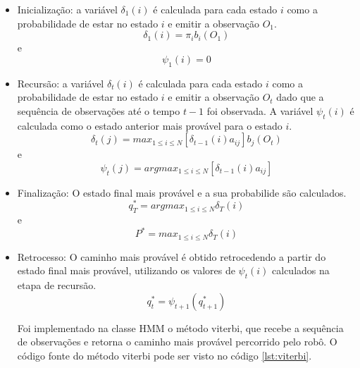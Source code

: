 \begin{itemize}
\begin{tcolorbox}[title=Resposta:]
        \begin{itemize}
            \item Inicialização: a variável \( \delta_1(i) \) é calculada para cada estado \( i \) como a probabilidade de estar no estado \( i \) e emitir a observação \( O_1 \).
            \begin{equation}
                \delta_1(i) = \pi_i b_i(O_1)
            \end{equation}
            e
            \begin{equation}
                \psi_1(i) = 0
            \end{equation}
            \item Recursão: a variável \( \delta_t(i) \) é calculada para cada estado \( i \) como a probabilidade de estar no estado \( i \) e emitir a observação \( O_t \) dado que a sequência de observações até o tempo \( t-1 \) foi observada. A variável \( \psi_t(i) \) é calculada como o estado anterior mais provável para o estado \( i \).
            \begin{equation}
                \delta_t(j) = max_{1 \leq i \leq N} [\delta_{t-1}(i) a_{ij}] b_j(O_t)
            \end{equation}
            e
            \begin{equation}
                \psi_t(j) = argmax_{1 \leq i \leq N} [\delta_{t-1}(i) a_{ij}]
            \end{equation}
        \item Finalização: O estado final mais provável e a sua probabilide são calculados.
        \begin{equation}
            q_T^* = argmax_{1 \leq i \leq N} \delta_T(i)
        \end{equation}
        e
        \begin{equation}
            P^* = max_{1 \leq i \leq N} \delta_T(i)
        \end{equation}
        \item Retrocesso: O caminho mais provável é obtido retrocedendo a partir do estado final mais provável, utilizando os valores de \( \psi_t(i) \) calculados na etapa de recursão.
        \begin{equation}
            q_t^* = \psi_{t+1}(q_{t+1}^*)
        \end{equation}

        Foi implementado na classe HMM o método viterbi, que recebe a sequência de observações e retorna o caminho mais provável percorrido pelo robô. O código fonte do método viterbi pode ser visto no código \ref{lst:viterbi}.
        \end{itemize}


\end{tcolorbox}
\end{itemize}
